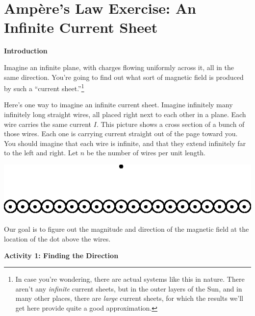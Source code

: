 \section[Ampere's Law Exercise: An Infinite Current Sheet]{Amp\`ere's Law Exercise: An Infinite Current Sheet}

\makelabheader %

\bigskip

\textbf{Introduction}

Imagine an infinite plane, with charges flowing uniformly across it,
all in the same direction. You're going to find out what sort of
magnetic field is produced by such a ``current sheet.''\footnote{In
case you're wondering, there are actual systems like this in nature.
There aren't any \textit{infinite} current sheets, but in the outer
layers of the Sun, and in many other places, there are \textit{large}
current sheets, for which the results we'll get here provide quite a good
approximation.}

Here's one way to imagine an infinite current sheet. Imagine infinitely
many infinitely long straight wires, all placed right next to each other
in a plane. Each wire carries the same current $I$. This picture shows
a cross section of a bunch of those wires. Each one is carrying current
straight out of the page toward you. You should imagine that each wire
is infinite, and that they extend infinitely far to the left and right.
Let $n$ be the number of wires per unit length.

\bigskip\bigskip

\centerline{\includegraphics{amperes_law_infinite_sheet/wires_with_dot.eps}}

\bigskip\bigskip

Our goal is to figure out the magnitude and direction of the magnetic field
at the location of the dot above the wires.

\textbf{Activity 1: Finding the Direction}


